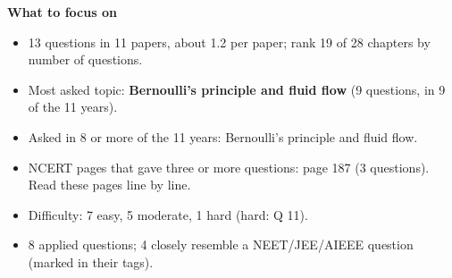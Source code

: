 \begin{minipage}[t]{0.63\linewidth}{\small\textbf{\color{crimson}What to focus on}\par\smallskip
\begin{itemize}[leftmargin=1.1em,itemsep=1pt,topsep=0pt]
\item 13 questions in 11 papers, about 1.2 per paper; rank 19 of 28 chapters by number of questions.
\item Most asked topic: \textbf{Bernoulli's principle and fluid flow} (9 questions, in 9 of the 11 years).
\item Asked in 8 or more of the 11 years: Bernoulli's principle and fluid flow.
\item NCERT pages that gave three or more questions: page 187 (3 questions). Read these pages line by line.
\item Difficulty: 7 easy, 5 moderate, 1 hard (hard: Q 11).
\item 8 applied questions; 4 closely resemble a NEET/JEE/AIEEE question (marked in their tags).
\end{itemize}}\end{minipage}\par
{}
